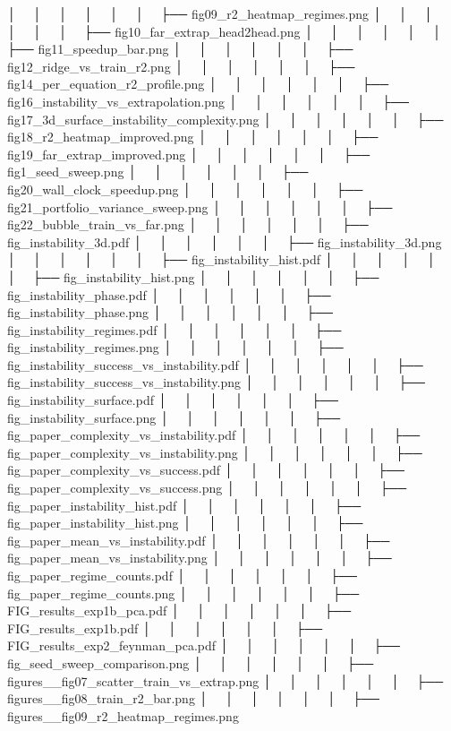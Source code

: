 │   │       │   │   │   │   ├── fig09_r2_heatmap_regimes.png
│   │       │   │   │   │   ├── fig10_far_extrap_head2head.png
│   │       │   │   │   │   ├── fig11_speedup_bar.png
│   │       │   │   │   │   ├── fig12_ridge_vs_train_r2.png
│   │       │   │   │   │   ├── fig14_per_equation_r2_profile.png
│   │       │   │   │   │   ├── fig16_instability_vs_extrapolation.png
│   │       │   │   │   │   ├── fig17_3d_surface_instability_complexity.png
│   │       │   │   │   │   ├── fig18_r2_heatmap_improved.png
│   │       │   │   │   │   ├── fig19_far_extrap_improved.png
│   │       │   │   │   │   ├── fig1_seed_sweep.png
│   │       │   │   │   │   ├── fig20_wall_clock_speedup.png
│   │       │   │   │   │   ├── fig21_portfolio_variance_sweep.png
│   │       │   │   │   │   ├── fig22_bubble_train_vs_far.png
│   │       │   │   │   │   ├── fig_instability_3d.pdf
│   │       │   │   │   │   ├── fig_instability_3d.png
│   │       │   │   │   │   ├── fig_instability_hist.pdf
│   │       │   │   │   │   ├── fig_instability_hist.png
│   │       │   │   │   │   ├── fig_instability_phase.pdf
│   │       │   │   │   │   ├── fig_instability_phase.png
│   │       │   │   │   │   ├── fig_instability_regimes.pdf
│   │       │   │   │   │   ├── fig_instability_regimes.png
│   │       │   │   │   │   ├── fig_instability_success_vs_instability.pdf
│   │       │   │   │   │   ├── fig_instability_success_vs_instability.png
│   │       │   │   │   │   ├── fig_instability_surface.pdf
│   │       │   │   │   │   ├── fig_instability_surface.png
│   │       │   │   │   │   ├── fig_paper_complexity_vs_instability.pdf
│   │       │   │   │   │   ├── fig_paper_complexity_vs_instability.png
│   │       │   │   │   │   ├── fig_paper_complexity_vs_success.pdf
│   │       │   │   │   │   ├── fig_paper_complexity_vs_success.png
│   │       │   │   │   │   ├── fig_paper_instability_hist.pdf
│   │       │   │   │   │   ├── fig_paper_instability_hist.png
│   │       │   │   │   │   ├── fig_paper_mean_vs_instability.pdf
│   │       │   │   │   │   ├── fig_paper_mean_vs_instability.png
│   │       │   │   │   │   ├── fig_paper_regime_counts.pdf
│   │       │   │   │   │   ├── fig_paper_regime_counts.png
│   │       │   │   │   │   ├── FIG_results_exp1b_pca.pdf
│   │       │   │   │   │   ├── FIG_results_exp1b.pdf
│   │       │   │   │   │   ├── FIG_results_exp2_feynman_pca.pdf
│   │       │   │   │   │   ├── fig_seed_sweep_comparison.png
│   │       │   │   │   │   ├── figures__fig07_scatter_train_vs_extrap.png
│   │       │   │   │   │   ├── figures__fig08_train_r2_bar.png
│   │       │   │   │   │   ├── figures__fig09_r2_heatmap_regimes.png
